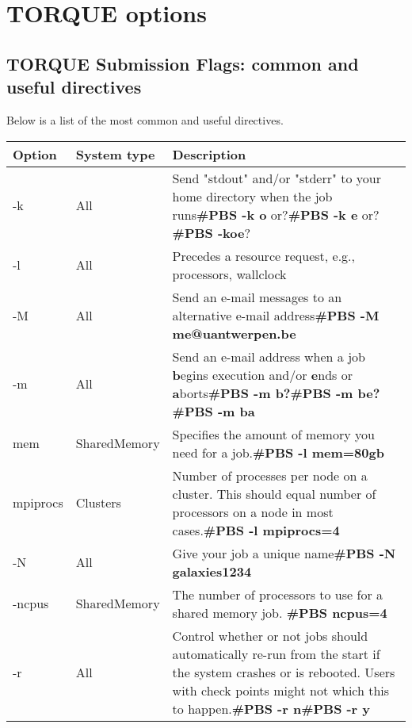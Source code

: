 \chapter{TORQUE options}

\section{TORQUE Submission Flags: common and useful directives}

Below is a list of the most common and useful directives.

\begin{tabular}{|p{0.5in}|p{0.5in}|p{3.5in}|} \hline
\textbf{Option} & \textbf{System type} & \textbf{Description} \\ \hline
-k & All & Send "stdout" and/or "stderr" to your home directory when the job runs\newline \textbf{\#PBS -k o} or?\textbf{\#PBS -k e} or?\textbf{\#PBS -koe}? \\ \hline
-l & All & Precedes a resource request, e.g., processors, wallclock \\ \hline
-M & All & Send an e-mail messages to an alternative e-mail address\newline \textbf{\#PBS -M me@uantwerpen.be} \\ \hline
-m & All & Send an e-mail address when a job \textbf{b}egins execution and/or \textbf{e}nds or \textbf{a}borts\newline \textbf{\#PBS -m b?\#PBS -m be?\#PBS -m ba} \\ \hline
mem & Shared\newline Memory & Specifies the amount of memory you need for a job.\newline \textbf{\#PBS -l mem=80gb} \\ \hline
mpiprocs & Clusters & Number of processes per node on a cluster. This should equal number of processors on a node in most cases.\newline \textbf{\#PBS -l mpiprocs=4} \\ \hline
-N & All & Give your job a unique name\newline \textbf{\#PBS -N galaxies1234} \\ \hline
-ncpus & Shared\newline Memory & The number of processors to use for a shared memory job. \newline \textbf{\#PBS ncpus=4} \\ \hline
-r & All & Control whether or not jobs should automatically re-run from the start if the system crashes or is rebooted. Users with check points might not which this to happen.\newline \textbf{\#PBS -r n\newline \#PBS -r y} \\ \hline

\end{tabular}
